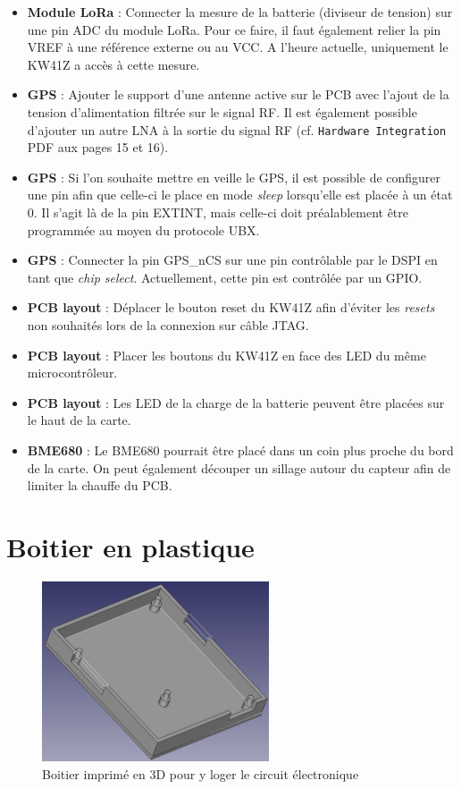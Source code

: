 \begin{itemize}
    \item \textbf{Module LoRa} : Connecter la mesure de la batterie (diviseur de tension) sur une pin ADC du module LoRa. Pour ce faire, il faut également relier la pin VREF à une référence externe ou au VCC. A l'heure actuelle, uniquement le KW41Z a accès à cette mesure.
    \item \textbf{GPS} : Ajouter le support d'une antenne active sur le PCB avec l'ajout de la tension d'alimentation filtrée sur le signal RF. Il est également possible d'ajouter un autre LNA à la sortie du signal RF (cf. \texttt{Hardware Integration} PDF aux pages 15 et 16). 
    \item \textbf{GPS} : Si l'on souhaite mettre en veille le GPS, il est possible de configurer une pin afin que celle-ci le place en mode \textit{sleep} lorsqu'elle est placée à un état 0. Il s'agit là de la pin EXTINT, mais celle-ci doit préalablement être programmée au moyen du protocole UBX.
    \item \textbf{GPS} : Connecter la pin GPS\_nCS sur une pin contrôlable par le DSPI en tant que \textit{chip select}. Actuellement, cette pin est contrôlée par un GPIO.
    \item \textbf{PCB layout} : Déplacer le bouton reset du KW41Z afin d'éviter les \textit{resets} non souhaités lors de la connexion sur câble JTAG. 
    \item \textbf{PCB layout} : Placer les boutons du KW41Z en face des LED du même microcontrôleur.
    \item \textbf{PCB layout} : Les LED de la charge de la batterie peuvent être placées sur le haut de la carte.
    \item \textbf{BME680} : Le BME680 pourrait être placé dans un coin plus proche du bord de la carte. On peut également découper un sillage autour du capteur afin de limiter la chauffe du PCB.
\end{itemize}

\section{Boitier en plastique}

\begin{figure}[ht!]
    \centering
    \includegraphics[width=0.6\textwidth]{Figures/Hardware/3d_case_devbox.png}
    \caption{Boitier imprimé en 3D pour y loger le circuit électronique}
    \label{fig-3d_case_devbox}
\end{figure}

